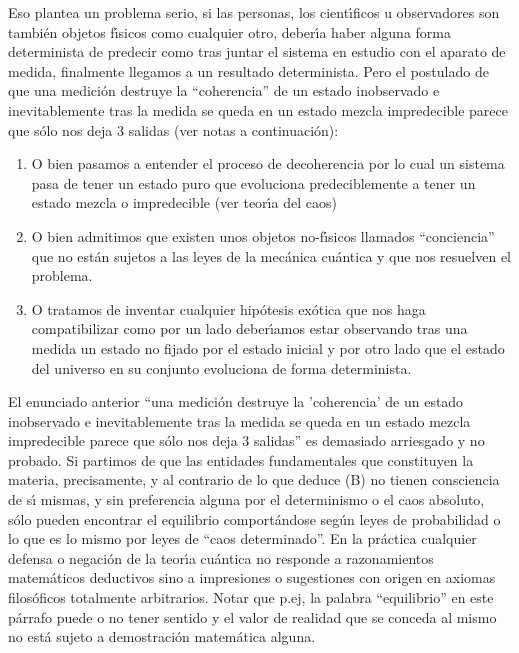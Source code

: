 \begin{enumerate}
Eso plantea un problema serio, si las personas, los cient\'{\i}ficos u observadores son tambi\'{e}n objetos f\'{\i}sicos como cualquier otro, deber\'{\i}a haber alguna forma determinista de predecir como tras juntar el sistema en estudio con el aparato de medida, finalmente llegamos a un resultado determinista. Pero el postulado de que una medici\'{o}n destruye la ``coherencia'' de un estado inobservado e inevitablemente tras la medida se queda en un estado mezcla impredecible parece que s\'{o}lo nos deja 3 salidas (ver notas a continuaci\'{o}n):
\begin{enumerate}
\item O bien pasamos a entender el proceso de decoherencia por lo cual un sistema pasa de tener un estado puro que evoluciona predeciblemente a tener un estado mezcla o impredecible (ver teor\'{\i}a del caos)
\item  O bien admitimos que existen unos objetos no-f\'{\i}sicos llamados ``conciencia'' que no est\'{a}n sujetos a las leyes de la mec\'{a}nica cu\'{a}ntica y que nos resuelven el problema.
\item  O tratamos de inventar cualquier hip\'{o}tesis ex\'{o}tica que nos haga compatibilizar como por un lado deber\'{\i}amos estar observando tras una medida un estado no fijado por el estado inicial y por otro lado que el estado del universo en su conjunto evoluciona de forma determinista.
\end{enumerate}
El enunciado anterior ``una medici\'{o}n destruye la 'coherencia' de un estado inobservado e inevitablemente tras la medida se queda en un estado mezcla impredecible parece que s\'{o}lo nos deja 3 salidas'' es demasiado arriesgado y no probado. Si partimos de que las entidades fundamentales que constituyen la materia, precisamente, y al contrario de lo que deduce (B) no tienen consciencia de s\'{\i} mismas, y sin preferencia alguna por el determinismo o el caos absoluto, s\'{o}lo pueden encontrar el equilibrio comport\'{a}ndose seg\'{u}n leyes de probabilidad o lo que es lo mismo por leyes de ``caos determinado''. En la pr\'{a}ctica cualquier defensa o negaci\'{o}n de la teor\'{\i}a cu\'{a}ntica no responde a razonamientos matem\'{a}ticos deductivos sino a impresiones o sugestiones con origen en axiomas filos\'{o}ficos totalmente arbitrarios. Notar que p.ej, la palabra ``equilibrio'' en este p\'{a}rrafo puede o no tener sentido y el valor de realidad que se conceda al mismo no est\'{a} sujeto a demostraci\'{o}n matem\'{a}tica alguna.
\end{enumerate}


